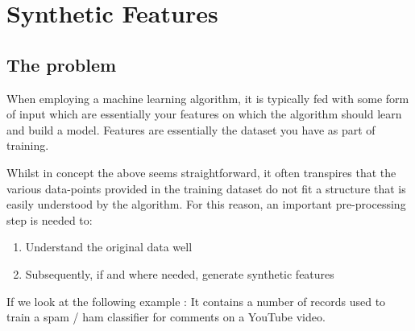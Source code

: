 \chapter{Synthetic Features}
\label{ch:synthetic features}

\section{The problem}
When employing a machine learning algorithm, it is typically fed with some form of input which are essentially your features on which the algorithm should learn and build a model. Features are essentially the dataset you have as part of training.

Whilst in concept the above seems straightforward, it often transpires that the various data-points provided in the training dataset do not fit a structure that is easily understood by the algorithm. For this reason, an important pre-processing step is needed to:

\begin{enumerate}
    \item Understand the original data well
    \item Subsequently, if and where needed, generate synthetic features
\end{enumerate}

If we look at the following example \citep{AlbertoTubeSpam}: It contains a number of records used to train a spam / ham classifier for comments on a YouTube video.

\begin{table}[ht]
    \centering
    \selectfont
    \caption{Sample of four rows from the Psy dataset from the YouTube comment training dataset.}
    \label{tab:sf_origdatasample}
\end{table}
\vspace{2mm}

